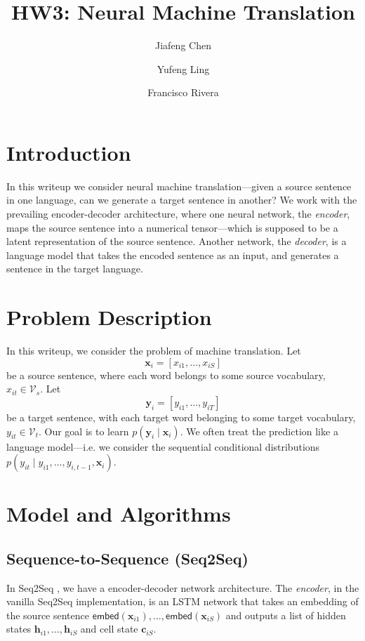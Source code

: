 \documentclass[12pt]{article}
\title{HW3: Neural Machine Translation}
\author{Jiafeng Chen \and Yufeng Ling \and
Francisco Rivera}
\newcommand{\sts}{Seq2Seq}
\newcommand{\embed}{\mathsf{embed}}
\begin{document}
\maketitle

\section{Introduction}
In this writeup we consider neural machine translation---given a source sentence in one language, can we generate a target sentence in another? We work with the prevailing encoder-decoder architecture, where one neural network, the \emph{encoder}, maps the source sentence into a numerical tensor---which is supposed to be a latent representation of the source sentence. Another network, the \emph{decoder}, is a language model that takes the encoded sentence as an input, and generates a sentence in the target language. 

\section{Problem Description}
In this writeup, we consider the problem of machine translation. Let 
\begin{equation}
	\bm x_i = [x_{i1},\ldots,x_{iS}]
\end{equation}
be a source sentence, where each word belongs to some source vocabulary, $x_{it} \in \mathcal V_s$. Let 
\begin{equation}
	\bm y_i = [y_{i1},\ldots,y_{iT}]
\end{equation}
be a target sentence, with each target word belonging to some target vocabulary, $y_{it} \in \mathcal V_t$. Our goal is to learn $p(\bm y_i \mid \bm x_i)$. We often treat the prediction like a language model---i.e. we consider the sequential conditional distributions $p(y_{it} \mid y_{i1},\ldots,y_{i,t-1}, \bm x_i)$.


\section{Model and Algorithms}

\subsection{Sequence-to-Sequence (\sts)}
\label{sub:seq2seq}
In \sts{} , we have a encoder-decoder network architecture. The \emph{encoder}, in the vanilla \sts{} implementation, is an LSTM network that takes an embedding of the source sentence $\embed(\bm x_{i1}),\ldots,\embed(\bm x_{iS})$ and outputs a list of hidden states $\bm h_{i1},\ldots, \bm h_{iS}$ and cell state $\bm c_{iS}$.
\end{document}
